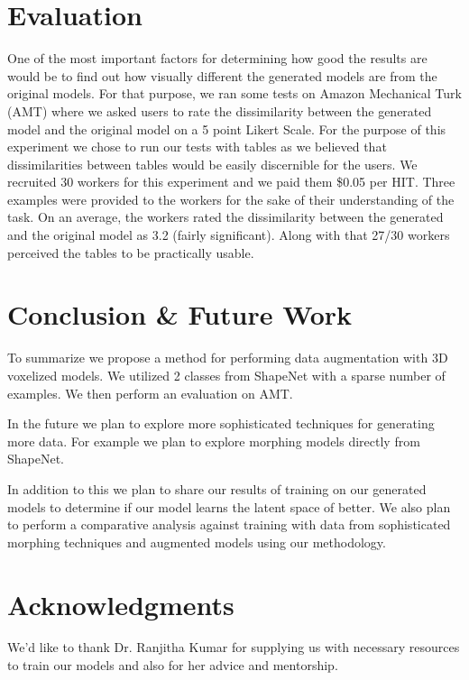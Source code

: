 \documentclass{sigchi}
\begin{document}
\section{Evaluation}

One of the most important factors for determining how good the results are would be to find out how visually different the generated models are from the original models. For that purpose, we ran some tests on Amazon Mechanical Turk (AMT) where we asked users to rate the dissimilarity between the generated model and the original model on a 5 point Likert Scale. For the purpose of this experiment we chose to run our tests with tables as we believed that dissimilarities between tables would be easily discernible for the users. 
We recruited 30 workers for this experiment and we paid them \$0.05 per HIT. Three examples were provided to the workers for the sake of their understanding of the task. 
On an average, the workers rated the dissimilarity between the generated and the original model as 3.2 (fairly significant). Along with that 27/30 workers perceived the tables to be practically usable. 



\section{Conclusion \& Future Work}
To summarize we propose a method for performing data augmentation with 3D voxelized models. We utilized 2 classes from ShapeNet with a sparse number of examples. We then perform an evaluation on AMT.

In the future we plan to explore more sophisticated techniques for generating more data. For example we plan to explore morphing models directly from ShapeNet. 

In addition to this we plan to share our results of training on our generated models to determine if our model learns the latent space of better. We also plan to perform a comparative analysis against training with data from sophisticated morphing techniques and augmented models using our methodology.


\section{Acknowledgments}
We'd like to thank Dr. Ranjitha Kumar for supplying us with necessary resources to train our models and also for her advice and mentorship.
\balance




\end{document}
